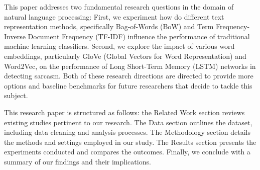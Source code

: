 This paper addresses two fundamental research questions in the domain of natural language processing: First, we experiment how do different text representation methods, 
specifically Bag-of-Words (BoW) and Term Frequency-Inverse Document Frequency (TF-IDF) influence the performance of traditional machine learning classifiers. 
Second, we explore the impact of various word embeddings, particularly GloVe (Global Vectors for Word Representation) and Word2Vec, on the performance of Long Short-Term Memory (LSTM) 
networks in detecting sarcasm. Both of these research directions are directed to provide more options and baseline benchmarks for future researchers that decide to tackle this subject.

This research paper is structured as follows: the Related Work section reviews existing studies pertinent to our research. The Data section outlines the dataset, including data cleaning and 
analysis processes. The Methodology section details the methods and settings employed in our study. The Results section presents the experiments conducted and compares the outcomes. 
Finally, we conclude with a summary of our findings and their implications.
